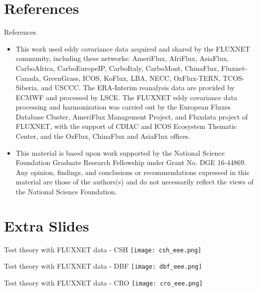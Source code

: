 \documentclass{beamer}
\begin{document}
\section{References}
\begin{frame}{References}
  \AtNextBibliography{\small}
  \printbibliography
  \scriptsize
  \begin{itemize}
  \item This work used eddy covariance data acquired and shared by the FLUXNET community, including these networks: AmeriFlux, AfriFlux, AsiaFlux, CarboAfrica, CarboEuropeIP, CarboItaly, CarboMont, ChinaFlux, Fluxnet-Canada, GreenGrass, ICOS, KoFlux, LBA, NECC, OzFlux-TERN, TCOS-Siberia, and USCCC. The ERA-Interim reanalysis data are provided by ECMWF and processed by LSCE. The FLUXNET eddy covariance data processing and harmonization was carried out by the European Fluxes Database Cluster, AmeriFlux Management Project, and Fluxdata project of FLUXNET, with the support of CDIAC and ICOS Ecosystem Thematic Center, and the OzFlux, ChinaFlux and AsiaFlux offices.
    \item This material is based upon work supported by the National Science Foundation Graduate Research Fellowship under Grant No. DGE 16-44869. Any opinion, findings, and conclusions or recommendations expressed in this material are those of the authors(s) and do not necessarily reflect the views of the National Science Foundation.
    \end{itemize}
\end{frame}

\section{Extra Slides}

    \begin{frame}{Test theory with FLUXNET data - CSH}
                \texttt{[image: csh\_eee.png]}
     \end{frame}


    \begin{frame}{Test theory with FLUXNET data - DBF}
                \texttt{[image: dbf\_eee.png]}
     \end{frame}

    \begin{frame}{Test theory with FLUXNET data - CRO}
                \texttt{[image: cro\_eee.png]}
     \end{frame}
\end{document}
